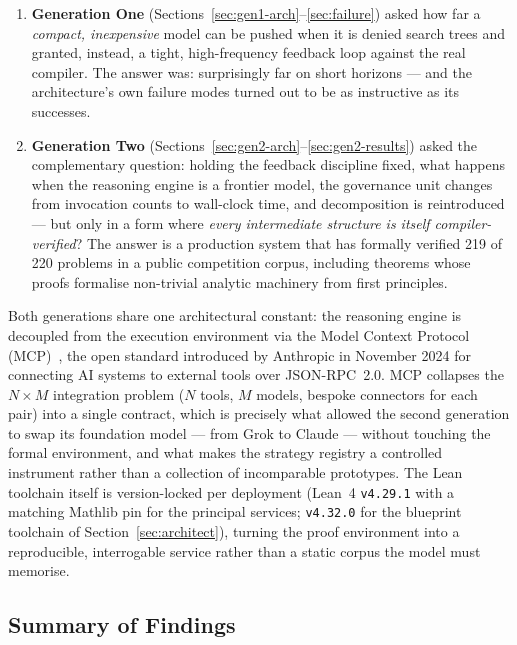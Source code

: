 \documentclass[12pt, a4paper]{article}
\begin{document}
\begin{enumerate}[leftmargin=*]
  \item \textbf{Generation One} (Sections~\ref{sec:gen1-arch}--\ref{sec:failure})
    asked how far a \emph{compact, inexpensive} model can be pushed when it is
    denied search trees and granted, instead, a tight, high-frequency feedback
    loop against the real compiler. The answer was: surprisingly far on short
    horizons --- and the architecture's own failure modes turned out to be as
    instructive as its successes.
  \item \textbf{Generation Two} (Sections~\ref{sec:gen2-arch}--\ref{sec:gen2-results})
    asked the complementary question: holding the feedback discipline fixed,
    what happens when the reasoning engine is a frontier model, the governance
    unit changes from invocation counts to wall-clock time, and decomposition
    is reintroduced --- but only in a form where \emph{every intermediate
    structure is itself compiler-verified}? The answer is a production system
    that has formally verified 219 of 220 problems in a public competition
    corpus, including theorems whose proofs formalise non-trivial analytic
    machinery from first principles.
\end{enumerate}

Both generations share one architectural constant: the reasoning engine is
decoupled from the execution environment via the Model Context Protocol
(MCP)~\cite{anthropic2024mcp}, the open standard introduced by Anthropic in
November 2024 for connecting AI systems to external tools over
JSON-RPC~2.0. MCP collapses the $N \times M$ integration problem ($N$ tools,
$M$ models, bespoke connectors for each pair) into a single contract, which
is precisely what allowed the second generation to swap its foundation model
--- from Grok to Claude --- without touching the formal environment, and what
makes the strategy registry a controlled instrument rather than a collection
of incomparable prototypes. The Lean toolchain itself is version-locked per
deployment (Lean~4 \texttt{v4.29.1} with a matching Mathlib pin for the
principal services; \texttt{v4.32.0} for the blueprint toolchain of
Section~\ref{sec:architect}), turning the proof environment into a
reproducible, interrogable service rather than a static corpus the model
must memorise.

\subsection{Summary of Findings}
\end{document}
